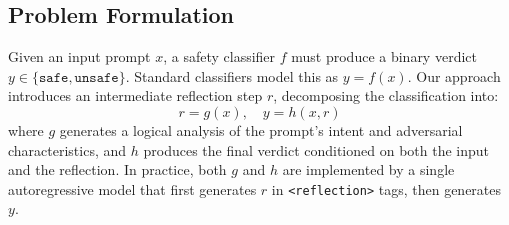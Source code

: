 \documentclass[superintelligence,article,accept,moreauthors]{Definitions/mdpi}
\renewcommand{\hl}[1]{#1}
\begin{document}
\subsection{Problem Formulation}

Given an input prompt $x$, a safety classifier $f$ must produce a binary verdict \mbox{$y \in \{\texttt{safe}, \texttt{unsafe}\}$.} Standard classifiers model this as $y = f(x)$. Our approach introduces an intermediate reflection step $r$, decomposing the classification \hl{into:} %
\begin{equation}
  r = g(x), \quad y = h(x, r)
\end{equation}
where $g$ generates a logical analysis of the prompt's intent and adversarial characteristics, and $h$ produces the final verdict conditioned on both the input and the reflection. In practice, both $g$ and $h$ are implemented by a single autoregressive model that first generates $r$ in \texttt{<reflection>} tags, then generates $y$.
\end{document}
